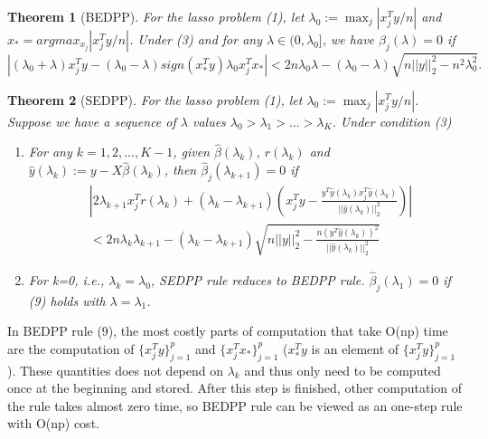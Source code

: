 \documentclass{article}
\newtheorem{theorem}{Theorem}[section]
\begin{document}
\begin{theorem}[BEDPP]
    For the lasso problem (1), let $\lambda_0:=\max_j|x_j^Ty/n|$ and $x_*=argmax_{x_j}|x_j^Ty/n|$. Under (3) and for any $\lambda\in(0,\lambda_0]$, we have $\hat{\beta}_j(\lambda)=0$ if
    \begin{equation}
        |(\lambda_0+\lambda)x_j^Ty-(\lambda_0-\lambda)sign(x_*^Ty)\lambda_0x_j^Tx_*|<2n\lambda_0\lambda-(\lambda_0-\lambda)\sqrt{n||y||_2^2-n^2\lambda_0^2}.
    \end{equation}
\end{theorem}

\begin{theorem}[SEDPP]
    For the lasso problem (1), let $\lambda_0:=\max_j|x_j^Ty/n|$. Suppose we have a sequence of $\lambda$ values $\lambda_0>\lambda_1>...>\lambda_K$. Under condition (3)
    \begin{enumerate}
        \item For any $k=1,2,...,K-1$, given $\hat{\beta}(\lambda_k)$, $r(\lambda_k)$ and $\hat{y}(\lambda_k):=y-X\hat{\beta}(\lambda_k)$, then $\hat{\beta}_j(\lambda_{k+1})=0$ if
        \begin{equation}
            \begin{split}
                &\left|2\lambda_{k+1}x_j^Tr(\lambda_k)+(\lambda_k-\lambda_{k+1})\left( x_j^Ty-\frac{y^T\hat{y}(\lambda_k)x_j^T\hat{y}(\lambda_k)}{||\hat{y}(\lambda_k)||_2^2}\right)\right|\\&<2n\lambda_k\lambda_{k+1}-(\lambda_k-\lambda_{k+1})\sqrt{n||y||_2^2-\frac{n(y^T\hat{y}(\lambda_k))^2}{||\hat{y}(\lambda_k)||_2^2}}
            \end{split}
        \end{equation}
        \item For k=0, i.e., $\lambda_k=\lambda_0$, SEDPP rule reduces to BEDPP rule. $\hat{\beta}_j(\lambda_1)=0$ if (9) holds with $\lambda=\lambda_1$.
    \end{enumerate}
\end{theorem}

In BEDPP rule (9), the most costly parts of computation that take O(np) time are the computation of $\{x_j^Ty\}_{j=1}^p$ and $\{x_j^Tx_*\}_{j=1}^p$ ($x_*^Ty$ is an element of $\{x_j^Ty\}_{j=1}^p$). These quantities does not depend on $\lambda_k$ and thus only need to be computed once at the beginning and stored. After this step is finished, other computation of the rule takes almost zero time, so BEDPP rule can be viewed as an one-step rule with O(np) cost.
\end{document}
